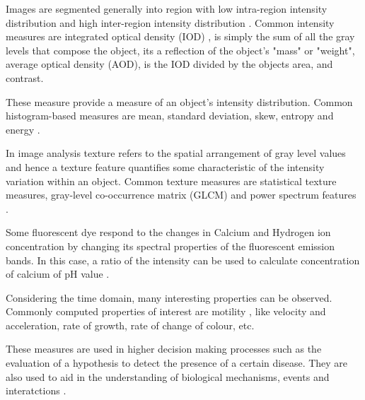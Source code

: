 \begin{definition}
	Images are segmented generally into region with low intra-region intensity distribution and high inter-region intensity distribution \citep{Pinkel1986,Meijering2004}.
	Common intensity measures are integrated optical density (IOD) \citep{Loferer1998,Watanabe1991}, is simply the sum of all the gray levels that compose the object, its a reflection of  the object's "mass" or "weight", average optical density (AOD), is the IOD divided by the objects area, and contrast.
\end{definition}

\begin{definition}
	These measure provide a measure of an object's intensity distribution.
	Common histogram-based measures are mean, standard deviation, skew, entropy and energy \citep{Rust2006,Boland2001}.
\end{definition}

\begin{definition}
	In image analysis texture refers to the spatial arrangement of gray level values \citep{Duda2001} and hence a texture feature quantifies some characteristic of the intensity variation within an object.
	Common texture measures are statistical texture measures, gray-level co-occurrence matrix (GLCM) \citep{Atlamazoglou2001,Cicchi2010} and power spectrum features \citep{Erik1999,Xu1996}.
\end{definition}

\begin{definition}
	Some fluorescent dye respond to the changes in Calcium and Hydrogen ion concentration by changing its spectral properties of the fluorescent emission bands. In this case, a ratio of the intensity can be used to calculate concentration of calcium of pH value \citep{Dobrucki2013}.
\end{definition}

\begin{definition}
	Considering the time domain, many interesting properties can be observed.
	Commonly computed properties of interest are motility \citep{Sekar2003,Miller1869,Mathur2000}, like velocity and acceleration, rate of growth, rate of change of colour, etc.
\end{definition}

These measures are used in higher decision making processes such as the evaluation of a hypothesis to detect the presence of a certain disease. They are also used to aid in the understanding of biological mechanisms, events and interatctions \citep{Danek2012}.